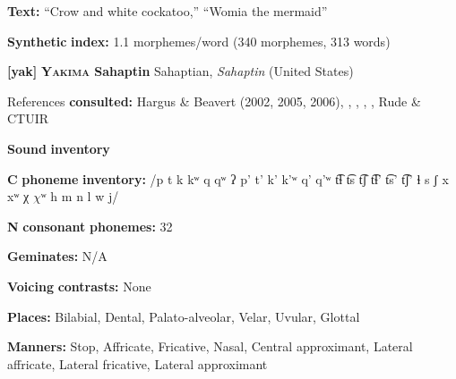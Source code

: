 \begin{styleBody}
\textbf{Text:} “Crow and white cockatoo,” “Womia the mermaid” \citep[378-382]{Marmion2010}
\end{styleBody}

\begin{styleBody}
\textbf{Synthetic} \textbf{index:} 1.1 morphemes/word (340 morphemes, 313 words)
\end{styleBody}

\begin{styleBody}
\textbf{[yak]}   \textbf{\textsc{Yakima} \textbf{Sahaptin}}  Sahaptian, \textit{Sahaptin} (United States)
\end{styleBody}

\begin{styleBody}
References \textbf{consulted:} Hargus \& Beavert (2002, 2005, 2006), \citet{Jansen2010}, \citet{Minthorn2005}, \citet{RigsbyRude1996}, \citet{Rude2009}, Rude \& CTUIR 
\end{styleBody}

\begin{styleBody}
\textbf{Sound} \textbf{inventory}
\end{styleBody}

\begin{styleBody}
\textbf{C} \textbf{phoneme} \textbf{inventory:} /p t k kʷ q qʷ ʔ p’ t’ k’ k’ʷ q’ q’ʷ t͡ɬ t͡s t͡ʃ t͡ɬ’ t͡s’ t͡ʃ’ ɬ s ʃ x xʷ χ $\chi ʷ$ h m n l w j/
\end{styleBody}

\begin{styleBody}
\textbf{N} \textbf{consonant} \textbf{phonemes:} 32
\end{styleBody}

\begin{styleBody}
\textbf{Geminates:} N/A
\end{styleBody}

\begin{styleBody}
\textbf{Voicing} \textbf{contrasts:} None
\end{styleBody}

\begin{styleBody}
\textbf{Places:} Bilabial, Dental, Palato-alveolar, Velar, Uvular, Glottal
\end{styleBody}

\begin{styleBody}
\textbf{Manners:} Stop, Affricate, Fricative, Nasal, Central approximant, Lateral affricate, Lateral fricative, Lateral approximant
\end{styleBody}

